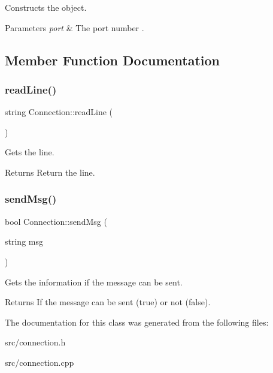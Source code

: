 Constructs the object. 


\begin{DoxyParams}{Parameters}
{\em port} & The port number . \\
\hline
\end{DoxyParams}


\subsection{Member Function Documentation}
\mbox{\label{class_connection_a1df16b436751b686d96c24ca0c498659}} 
\subsubsection{\texorpdfstring{readLine()}{readLine()}}
{\footnotesize\ttfamily string Connection\+::read\+Line (\begin{DoxyParamCaption}{ }\end{DoxyParamCaption})}



Gets the line. 

\begin{DoxyReturn}{Returns}
Return the line. 
\end{DoxyReturn}
\mbox{\label{class_connection_a4b9f6db1fb42fc9857f829fa0bc52e6e}} 
\subsubsection{\texorpdfstring{sendMsg()}{sendMsg()}}
{\footnotesize\ttfamily bool Connection\+::send\+Msg (\begin{DoxyParamCaption}\item[{string}]{msg }\end{DoxyParamCaption})}



Gets the information if the message can be sent. 

\begin{DoxyReturn}{Returns}
If the message can be sent (true) or not (false). 
\end{DoxyReturn}


The documentation for this class was generated from the following files\+:\begin{DoxyCompactItemize}
\item 
src/connection.\+h\item 
src/connection.\+cpp\end{DoxyCompactItemize}
